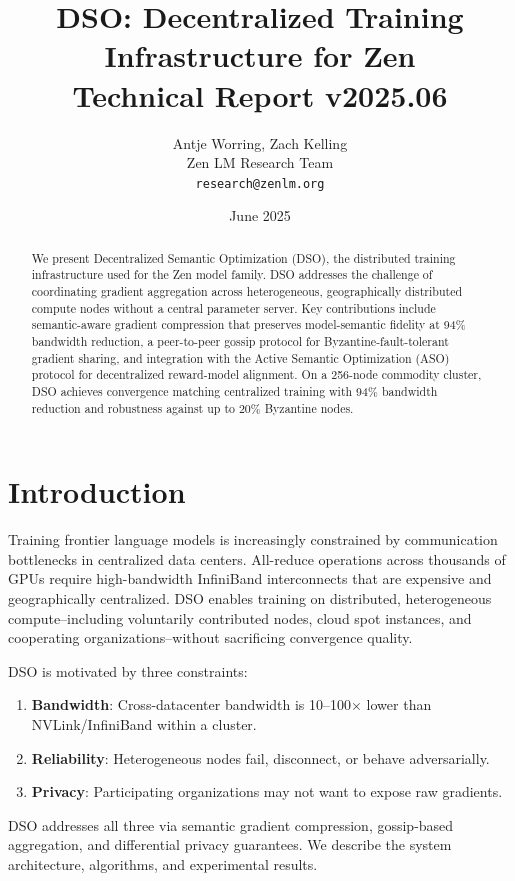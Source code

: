 \documentclass[11pt,a4paper]{article}
\title{\textbf{DSO: Decentralized Training Infrastructure for Zen}\\
\large Technical Report v2025.06}
\author{Antje Worring, Zach Kelling \\ Zen LM Research Team\\
\texttt{research@zenlm.org}}
\date{June 2025}
\begin{document}
\maketitle

\begin{abstract}
We present Decentralized Semantic Optimization (DSO), the distributed training
infrastructure used for the Zen model family. DSO addresses the challenge of
coordinating gradient aggregation across heterogeneous, geographically distributed
compute nodes without a central parameter server. Key contributions include
semantic-aware gradient compression that preserves model-semantic fidelity at 94\%
bandwidth reduction, a peer-to-peer gossip protocol for Byzantine-fault-tolerant
gradient sharing, and integration with the Active Semantic Optimization (ASO) protocol
for decentralized reward-model alignment. On a 256-node commodity cluster, DSO achieves
convergence matching centralized training with 94\% bandwidth reduction and robustness
against up to 20\% Byzantine nodes.
\end{abstract}

\section{Introduction}

Training frontier language models is increasingly constrained by communication bottlenecks
in centralized data centers. All-reduce operations across thousands of GPUs require
high-bandwidth InfiniBand interconnects that are expensive and geographically centralized.
DSO enables training on distributed, heterogeneous compute--including voluntarily
contributed nodes, cloud spot instances, and cooperating organizations--without
sacrificing convergence quality.

DSO is motivated by three constraints:
\begin{enumerate}
  \item \textbf{Bandwidth}: Cross-datacenter bandwidth is 10--100$\times$ lower than
    NVLink/InfiniBand within a cluster.
  \item \textbf{Reliability}: Heterogeneous nodes fail, disconnect, or behave adversarially.
  \item \textbf{Privacy}: Participating organizations may not want to expose raw gradients.
\end{enumerate}

DSO addresses all three via semantic gradient compression, gossip-based aggregation,
and differential privacy guarantees. We describe the system architecture, algorithms,
and experimental results.
\end{document}
